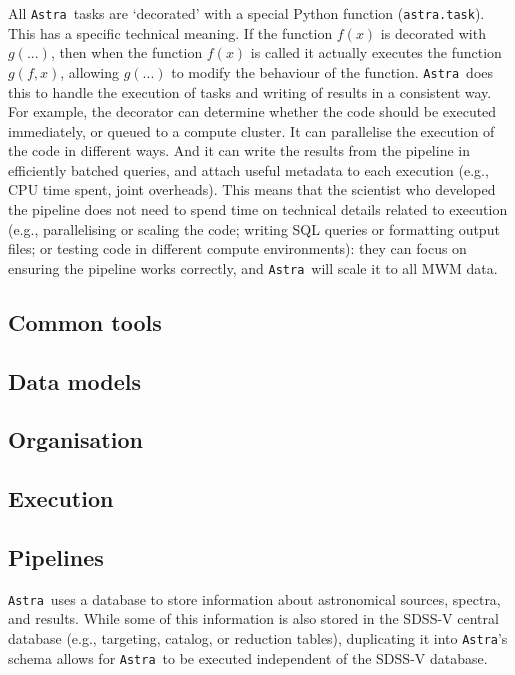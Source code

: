 \documentclass[modern]{aastex631}
\newcommand{\astra}{\texttt{Astra}}
\newcommand{\Astra}{\astra}
\begin{document}
All \Astra\ tasks are `decorated' with a special Python function (\texttt{astra.task}). This has a specific technical meaning. If the function $f(x)$ is decorated with $g(...)$, then when the function $f(x)$ is called it actually executes the function $g(f, x)$, allowing $g(...)$ to modify the behaviour of the function.
\Astra\ does this to handle the execution of tasks and writing of results in a consistent way.
For example, the decorator can determine whether the code should be executed immediately, or queued to a compute cluster. It can parallelise the execution of the code in different ways. And it can write the results from the pipeline in efficiently batched queries, and attach useful metadata to each execution (e.g., CPU time spent, joint overheads). This means that the scientist who developed the pipeline does not need to spend time on technical details related to execution (e.g., parallelising or scaling the code; writing SQL queries or formatting output files; or testing code in different compute environments): they can focus on ensuring the pipeline works correctly, and \Astra\ will scale it to all MWM data.



\subsection{Common tools}


\subsection{Data models}

\subsection{Organisation}

\subsection{Execution}

\subsection{Pipelines}

\Astra\ uses a database to store information about astronomical sources, spectra, and results. 
While some of this information is also stored in the SDSS-V central database (e.g., targeting, catalog, or reduction tables),
duplicating it into \Astra's schema allows for \Astra\ to be executed independent of the SDSS-V database.
\end{document}
